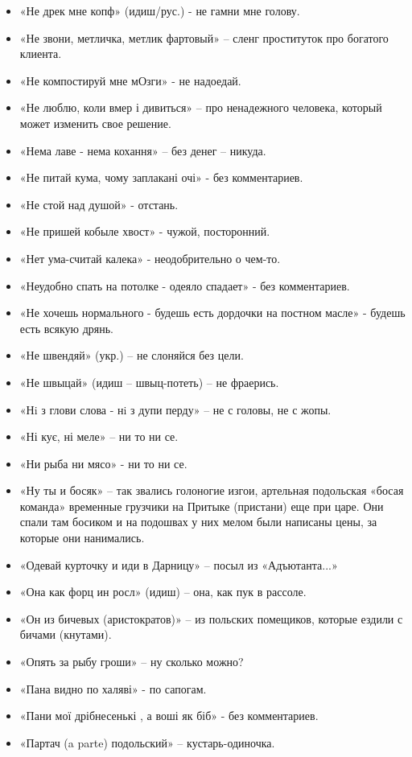 \begin{itemize}
\item  «Не дрек мне копф» (идиш/рус.) - не гамни мне голову. 
\item  «Не звони, метличка, метлик фартовый» – сленг проституток про богатого клиента.
\item  «Не компостируй мне мОзги» - не надоедай.
\item  «Не люблю, коли вмер і дивиться» – про ненадежного человека, который может изменить свое решение.
\item  «Нема лаве - нема кохання» – без денег – никуда.
\item  «Не питай кума, чому заплакані очі» - без комментариев.
\item  «Не стой над душой» - отстань.
\item  «Не пришей кобыле хвост» - чужой, посторонний.
\item  «Нет ума-считай калека» - неодобрительно о чем-то.
\item  «Неудобно спать на потолке - одеяло спадает» - без комментариев.
\item  «Не хочешь нормального - будешь есть дордочки на постном масле» - будешь есть всякую дрянь.
\item  «Не швендяй» (укр.) – не слоняйся без цели.
\item  «Не швыцай» (идиш – швыц-потеть) – не фраерись.
\item  «Нi з глови слова - нi з дупи перду» – не с головы, не с жопы.
\item  «Ні кує, ні меле» – ни то ни се. 
\item  «Ни рыба ни мясо» - ни то ни се.
\item  «Ну ты и босяк» – так звались голоногие изгои, артельная подольская «босая команда» временные грузчики на Притыке (пристани) еще при царе. Они спали там босиком и на подошвах у них мелом были написаны цены, за которые они нанимались.
\item  «Одевай курточку и иди в Дарницу» –  посыл из «Адъютанта...»
\item  «Она как форц ин росл» (идиш) – она, как пук в рассоле.
\item  «Он из бичевых (аристократов)» – из польских помещиков, которые ездили с бичами (кнутами). 
\item  «Опять за рыбу гроши» – ну сколько можно?
\item  «Пана видно по халяві» - по сапогам.
\item  «Пани мої дрібнесенькі , а воші як біб» - без комментариев.
\item  «Партач (a parte) подольский» – кустарь-одиночка.  

\end{itemize}
